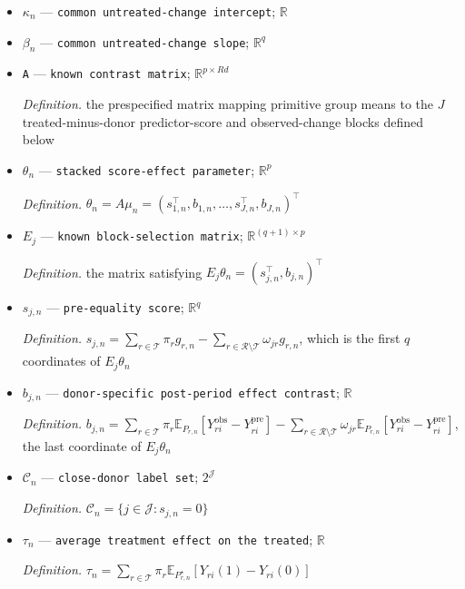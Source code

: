 \documentclass{article}
\begin{document}
\begin{itemize}
  \item \(\kappa_n\) --- \texttt{common untreated-\allowbreak{}change intercept}; \(\mathbb R\)
  \item \(\beta_n\) --- \texttt{common untreated-\allowbreak{}change slope}; \(\mathbb R^q\)
  \item \texttt{A} --- \texttt{known contrast matrix}; \(\mathbb R^{p\times Rd}\)
  \par\smallskip\noindent\emph{Definition.} the prespecified matrix mapping primitive group means to the \(J\) treated-minus-donor predictor-score and observed-change blocks defined below
  \item \(\theta_n\) --- \texttt{stacked score-\allowbreak{}effect parameter}; \(\mathbb R^p\)
  \par\smallskip\noindent\emph{Definition.} \(\theta_n=A\mu_n=(s_{1,n}^{\top},b_{1,n},\ldots,s_{J,n}^{\top},b_{J,n})^{\top}\)
  \item \(E_j\) --- \texttt{known block-\allowbreak{}selection matrix}; \(\mathbb R^{(q+1)\times p}\)
  \par\smallskip\noindent\emph{Definition.} the matrix satisfying \(E_j\theta_n=(s_{j,n}^{\top},b_{j,n})^{\top}\)
  \item \(s_{j,n}\) --- \texttt{pre-\allowbreak{}equality score}; \(\mathbb R^q\)
  \par\smallskip\noindent\emph{Definition.} \(s_{j,n}=\sum_{r\in\mathcal T}\pi_rg_{r,n}-\sum_{r\in\mathcal R\setminus\mathcal T}\omega_{jr}g_{r,n}\), which is the first \(q\) coordinates of \(E_j\theta_n\)
  \item \(b_{j,n}\) --- \texttt{donor-\allowbreak{}specific post-\allowbreak{}period effect contrast}; \(\mathbb R\)
  \par\smallskip\noindent\emph{Definition.} \(b_{j,n}=\sum_{r\in\mathcal T}\pi_r\mathbb E_{P_{r,n}}[Y_{ri}^{\mathrm{obs}}-Y_{ri}^{\mathrm{pre}}]-\sum_{r\in\mathcal R\setminus\mathcal T}\omega_{jr}\mathbb E_{P_{r,n}}[Y_{ri}^{\mathrm{obs}}-Y_{ri}^{\mathrm{pre}}]\), the last coordinate of \(E_j\theta_n\)
  \item \(\mathcal C_n\) --- \texttt{close-\allowbreak{}donor label set}; \(2^{\mathcal J}\)
  \par\smallskip\noindent\emph{Definition.} \(\mathcal C_n=\{j\in\mathcal J:s_{j,n}=0\}\)
  \item \(\tau_n\) --- \texttt{average treatment effect on the treated}; \(\mathbb R\)
  \par\smallskip\noindent\emph{Definition.} \(\tau_n=\sum_{r\in\mathcal T}\pi_r\mathbb E_{P_{r,n}^{\star}}[Y_{ri}(1)-Y_{ri}(0)]\)

\end{itemize}
\end{document}
